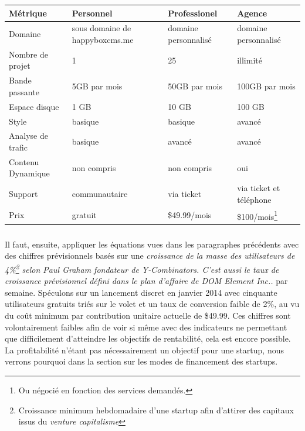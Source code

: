 \documentclass[11pt, a4paper ]{article}
\begin{document}
\begin{spacing}{1.5}
\begin{flushleft}
	\begin{tabular}{|l|l|l|l|}
		Métrique & Personnel & Professionel & Agence \\
		\hline
		Domaine & sous domaine de happyboxcms.me & domaine personnalisé & domaine personnalisé \\
		Nombre de projet & 1 & 25 & illimité \\
		Bande passante & 5GB par mois & 50GB par mois & 100GB par mois \\
		Espace disque & 1 GB & 10 GB & 100 GB \\
		Style & basique & basique & avancé \\
		Analyse de trafic & basique & avancé & avancé \\
		Contenu Dynamique & non compris & non compris & oui \\
		Support & communautaire & via ticket & via ticket et téléphone  \\
		Prix & gratuit & \$49.99/mois & \$100/mois\footnote{Ou négocié en fonction des services demandés.} \\

	\end{tabular}
\end{flushleft}
\subparagraph{}
Il faut, ensuite, appliquer les équations vues dans les paragraphes précédents avec des chiffres prévisionnels basés sur une \emph{croissance de la masse des utilisateurs de 4\%\footnote{Croissance minimum hebdomadaire d'une startup afin d'attirer des capitaux issus du \emph{venture capitalisme}} selon Paul Graham fondateur de Y-Combinators. 
C'est aussi le taux de croissance prévisionnel défini dans le plan d'affaire de DOM Element Inc..} par semaine.
Spéculons sur un lancement discret en janvier 2014 avec cinquante utilisateurs gratuits triés sur le volet et un taux de conversion faible de 2\%, au vu du coût minimum par contribution unitaire actuelle de \$49.99. Ces chiffres sont volontairement faibles afin de voir si même avec des indicateurs ne permettant que difficilement d'atteindre les objectifs de rentabilité, cela est encore possible. La profitabilité n'étant pas nécessairement un objectif pour une startup, nous verrons pourquoi dans la section sur les modes de financement des startups.



\end{spacing}
\end{document}

